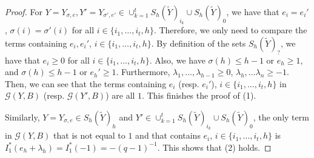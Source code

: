 \documentclass[11pt,oneside]{amsart}
\theoremstyle{plain}
\theoremstyle{definition}
\theoremstyle{remark}
\newcommand{\CG}{{\mathcal G}}
\numberwithin{equation}{section}
\begin{document}
\begin{proof}
		For $Y=Y_{\sigma,e}, Y'=Y_{\sigma',e'} \in \cup_{k=1}^{t} S_h(\widetilde{Y})_{i_k} \cup S_h(\widetilde{Y})_0$, we have that $e_i=e_i'$, $\sigma(i)=\sigma'(i)$ for all $i \in \lbrace i_1,\dots,i_t,h\rbrace$. Therefore, we only need to compare the terms containing $e_i, e_i'$, $i \in \lbrace i_1,\dots,i_t,h\rbrace$. By definition of the sets $S_h(\widetilde{Y})_?$, we have that $e_i \geq 0$ for all $i \in \lbrace i_1,\dots,i_t,h\rbrace$. Also, we have $\sigma(h)\leq h-1$ or $e_h \geq 1$, and $\sigma(h) \leq h-1$ or $e_h' \geq 1$. Furthermore, $\lambda_1,\dots, \lambda_{h-1} \geq 0$, $\lambda_h, \dots \lambda_{n} \geq -1$. Then, we can see that the terms containing $e_i$ (resp. $e_i'$), $i \in \lbrace i_1,\dots,i_t,h \rbrace$ in $\CG(Y,B)$ (resp. $\CG(Y',B)$) are all $1$. This finishes the proof of (1).
		
		Similarly, $Y=Y_{\sigma,e} \in S_h(\widetilde{Y})_h$ and $Y' \in \cup_{k=1}^{t} S_h(\widetilde{Y})_{i_k} \cup S_h(\widetilde{Y})_0$, the only term in $\CG(Y,B)$ that is not equal to $1$ and that contains $e_i$, $i \in \lbrace i_1,\dots,i_t,h \rbrace$ is $I_1^*(e_h+\lambda_h)=I_1^*(-1)=-(q-1)^{-1}$. This shows that (2) holds.
	\end{proof}
	
\end{document}
